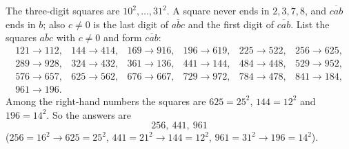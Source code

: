The three-digit squares are $10^2,\dots,31^2$. A square never ends in $2,3,7,8$, and $\overline{cab}$ ends in $b$; also $c\ne0$ is the last digit of $\overline{abc}$ and the first digit of $\overline{cab}$. List the squares $\overline{abc}$ with $c\ne0$ and form $\overline{cab}$:
\[
\begin{array}{llllll}
121\to112, & 144\to414, & 169\to916, & 196\to619, & 225\to522, & 256\to625,\\
289\to928, & 324\to432, & 361\to136, & 441\to144, & 484\to448, & 529\to952,\\
576\to657, & 625\to562, & 676\to667, & 729\to972, & 784\to478, & 841\to184,\\
961\to196. & & & & &
\end{array}
\]
Among the right-hand numbers the squares are $625=25^2$, $144=12^2$ and $196=14^2$. So the answers are
\[
\boxed{256,\ 441,\ 961}
\]
($256=16^2\to625=25^2$, $441=21^2\to144=12^2$, $961=31^2\to196=14^2$).
